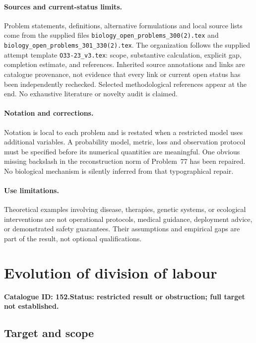 \documentclass[11pt]{article}
\begin{document}
\paragraph{Sources and current-status limits.}
Problem statements, definitions, alternative formulations and local source lists
come from the supplied files
\texttt{biology\_open\_problems\_300(2).tex} and
\texttt{biology\_open\_problems\_301\_330(2).tex}.
The organization follows the supplied attempt template
\texttt{O33-23\_v3.tex}: scope, substantive calculation, explicit gap,
completion estimate, and references. Inherited source annotations and links are
catalogue provenance, not evidence that every link or current open status has
been independently rechecked. Selected methodological references appear at the
end. No exhaustive literature or novelty audit is claimed.

\paragraph{Notation and corrections.}
Notation is local to each problem and is restated when a restricted model uses
additional variables. A probability model, metric, loss and observation protocol
must be specified before its numerical quantities are meaningful. One obvious
missing backslash in the reconstruction norm of Problem~77 has been repaired.
No biological mechanism is silently inferred from that typographical repair.

\paragraph{Use limitations.}
Theoretical examples involving disease, therapies, genetic systems, or ecological
interventions are not operational protocols, medical guidance, deployment advice,
or demonstrated safety guarantees. Their assumptions and empirical gaps are part
of the result, not optional qualifications.

\setcounter{section}{151}
\section{Evolution of division of labour}
\label{prob:152}
\noindent\textbf{Catalogue ID: 152.}\quad \textbf{Status: restricted result or obstruction; full target not established.}
\subsection{Target and scope}
\end{document}
